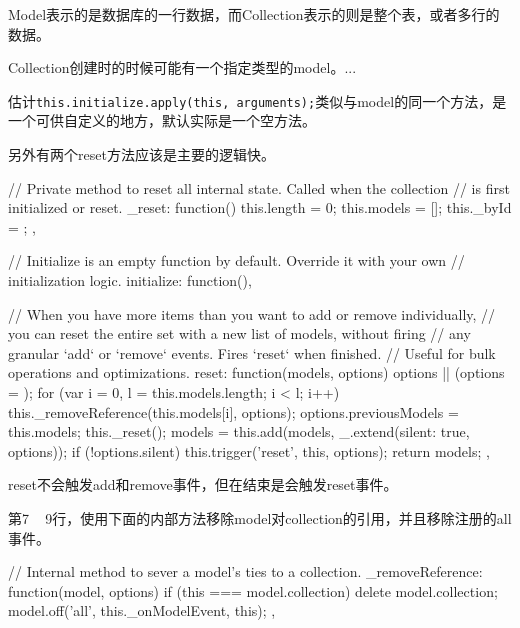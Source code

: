 Model表示的是数据库的一行数据，而Collection表示的则是整个表，或者多行的数据。

Collection创建时的时候可能有一个指定类型的model。...

估计\lstinline$this.initialize.apply(this, arguments);$类似与model的同一个方法，是一个可供自定义的地方，默认实际是一个空方法。

另外有两个reset方法应该是主要的逻辑快。


\begin{JavaScript}[\_reset初始化内部状态]

    // Private method to reset all internal state. Called when the collection
    // is first initialized or reset.
    _reset: function() {
      this.length = 0;
      this.models = [];
      this._byId  = {};
    },

\end{JavaScript}

\begin{JavaScript}[initialize是空方法]
    // Initialize is an empty function by default. Override it with your own
    // initialization logic.
    initialize: function(){},
\end{JavaScript}


\begin{JavaScript}[reset]
    // When you have more items than you want to add or remove individually,
    // you can reset the entire set with a new list of models, without firing
    // any granular `add` or `remove` events. Fires `reset` when finished.
    // Useful for bulk operations and optimizations.
    reset: function(models, options) {
      options || (options = {});
      for (var i = 0, l = this.models.length; i < l; i++) {
        this._removeReference(this.models[i], options);
      }
      options.previousModels = this.models;
      this._reset();
      models = this.add(models, _.extend({silent: true}, options));
      if (!options.silent) this.trigger('reset', this, options);
      return models;
    },

\end{JavaScript}

reset不会触发add和remove事件，但在结束是会触发reset事件。

第7 ~ 9行，使用下面的内部方法移除model对collection的引用，并且移除注册的all事件。
\begin{JavaScript}

    // Internal method to sever a model's ties to a collection.
    _removeReference: function(model, options) {
      if (this === model.collection) delete model.collection;
      model.off('all', this._onModelEvent, this);
    },
\end{JavaScript}

